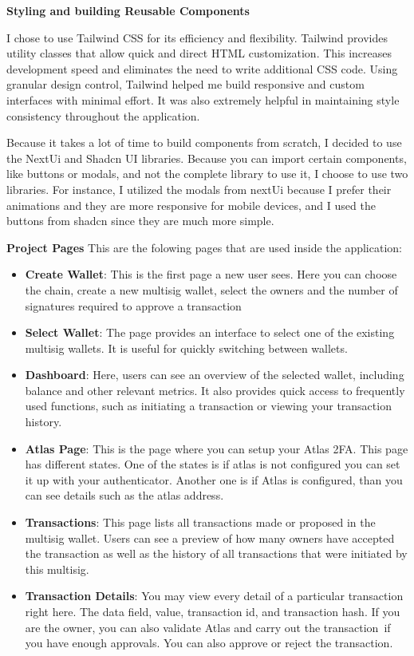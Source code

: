 \par \textbf{Styling and building Reusable Components}
\par I chose to use Tailwind CSS for its efficiency and flexibility. Tailwind provides utility classes that allow quick and direct HTML customization. This increases development speed and eliminates the need to write additional CSS code. Using granular design control, Tailwind helped me build responsive and custom interfaces with minimal effort. It was also extremely helpful in maintaining style consistency throughout the application. 
\par Because it takes a lot of time to build components from scratch, I decided to use the NextUi and Shadcn UI libraries. Because you can import certain components, like buttons or modals, and not the complete library to use it, I choose to use two libraries. For instance, I utilized the modals from nextUi because I prefer their animations and they are more responsive for mobile devices, and I used the buttons from shadcn since they are much more simple. 
\par \textbf{Project Pages}
This are the folowing pages that are used inside the application:
\begin{itemize}
	\item \textbf{Create Wallet}: This is the first page a new user sees. Here you can choose the chain, create a new multisig wallet, select the owners and the number of signatures required to approve a transaction
	\item \textbf{Select Wallet}: The page provides an interface to select one of the existing multisig wallets. It is useful for quickly switching between wallets.
	\item \textbf{Dashboard}: Here, users can see an overview of the selected wallet, including balance and other relevant metrics. It also provides quick access to frequently used functions, such as initiating a transaction or viewing your transaction history.
	\item \textbf{Atlas Page}: This is the page where you can setup your Atlas 2FA. This page has different states. One of the states is if atlas is not configured you can set it up with your authenticator. Another one is if Atlas is configured, than you can see details such as the atlas address.
	\item \textbf{Transactions}: This page lists all transactions made or proposed in the multisig wallet. Users can see a preview of how many owners have accepted the transaction as well as the history of all transactions that were initiated by this multisig.
	\item \textbf{Transaction Details}: You may view every detail of a particular transaction right here. The data field, value, transaction id, and transaction hash. If you are the owner, you can also validate Atlas and carry out the transaction if you have enough approvals. You can also approve or reject the transaction.
\end{itemize}
